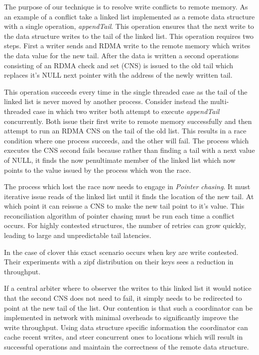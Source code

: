 The purpose of our technique is to resolve write conflicts to remote
memory. As an example of a conflict take a linked list implemented as
a remote data structure with a single operation, \textit{appendTail}.
This operation ensures that the next write to the data structure
writes to the tail of the linked list. This operation requires two
steps.  First a writer sends and RDMA write to the remote memory which
writes the data value for the new tail. After the data is written a
second operations consisting of an RDMA check and set (CNS) is issued
to the old tail which replaces it's NULL next pointer with the address
of the newly written tail.

This operation succeeds every time in the single threaded case as the
tail of the linked list is never moved by another process. Consider
instead the multi-threaded case in which two writer both attempt to
execute \textit{appendTail} concurrently. Both issue their first write
to remote memory successfully and then attempt to run an RDMA CNS on
the tail of the old list. This results in a race condition where one
process succeeds, and the other will fail. The process which executes
the CNS second fails because rather than finding a tail with a next
value of NULL, it finds the now penultimate member of the linked list
which now points to the value issued by the process which won the
race. 

The process which lost the race now needs to engage in \textit{Pointer
chasing}. It must iterative issue reads of the linked list until it
finds the location of the new tail. At which point it can reissue a
CNS to make the new tail point to it's value. This reconciliation
algorithm of pointer chasing must be run each time a conflict occurs.
For highly contested structures, the number of retries can grow
quickly, leading to large and unpredictable tail latencies.

In the case of clover this exact scenario occurs when key are write
contested. Their experiments with a zipf distribution on their keys
sees a  reduction in throughput.

If a central arbiter where to observer the writes to this linked list
it would notice that the second CNS does not need to fail, it simply
needs to be redirected to point at the new tail of the list. 
Our contention is that such a coordinator can be implemented in
network with minimal overheads to significantly improve the write
throughput. Using data structure specific information the coordinator
can cache recent writes, and steer concurrent ones to locations which
will result in successful operations and maintain the correctness of
the remote data structure.

